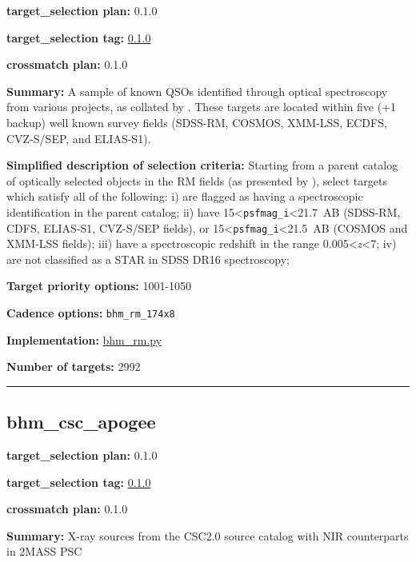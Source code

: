 \noindent\textbf{target\_selection plan:} 0.1.0

\noindent\textbf{target\_selection tag:}
\href{https://github.com/sdss/target_selection/tree/0.1.0/}{0.1.0}

\noindent\textbf{crossmatch plan:} 0.1.0

\noindent\textbf{Summary:} A sample of known QSOs identified through optical
spectroscopy from various projects, as collated by
\citet{Yang2022}. These targets are located within five (+1 backup) well
known survey fields (SDSS-RM, COSMOS, XMM-LSS, ECDFS, CVZ-S/SEP, and
ELIAS-S1).

\noindent\textbf{Simplified description of selection criteria:} Starting from a
parent catalog of optically selected objects in the RM fields (as
presented by
\citealt{Yang2022}), select targets which satisfy all of the following: i)
are flagged as having a spectroscopic identification in the parent
catalog; ii) have 15\textless{}\texttt{psfmag\_i}\textless21.7~AB
(SDSS-RM, CDFS, ELIAS-S1, CVZ-S/SEP fields), or
15\textless{}\texttt{psfmag\_i}\textless21.5~AB (COSMOS and XMM-LSS
fields); iii) have a spectroscopic redshift in the range
0.005\textless{}\emph{z}\textless7; iv) are not classified as a STAR in
SDSS DR16 spectroscopy;


\noindent\textbf{Target priority options:} 1001-1050

\noindent\textbf{Cadence options:} \texttt{bhm\_rm\_174x8}

\noindent\textbf{Implementation:}
\href{https://github.com/sdss/target_selection/blob/0.1.0/python/target_selection/cartons/bhm_rm.py}{bhm\_rm.py}

\noindent\textbf{Number of targets:} 2992

\begin{center}\rule{0.5\linewidth}{0.5pt}\end{center}

\hypertarget{bhm_csc_apogee_plan0.1.0}{%
\subsection{bhm\_csc\_apogee}\label{bhm_csc_apogee_plan0.1.0}}

\noindent\textbf{target\_selection plan:} 0.1.0

\noindent\textbf{target\_selection tag:}
\href{https://github.com/sdss/target_selection/tree/0.1.0/}{0.1.0}

\noindent\textbf{crossmatch plan:} 0.1.0

\noindent\textbf{Summary:} X-ray sources from the CSC2.0 source catalog with NIR
counterparts in 2MASS PSC


